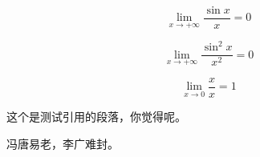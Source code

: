 \begin{example} 
    \[
        \lim_{x\to +\infty} \frac{\sin x}{x} = 0
    \]
\end{example}

\begin{corollary}
    \[
        \lim_{x\to +\infty} \frac{\sin^2 x}{x^2} = 0
    \]
\end{corollary}

\begin{remark}
    \[
        \lim_{x\to 0} \frac{x}{x} = 1
    \]
\end{remark}


这个是测试引用的段落\cite{Ibrahim2022}，你觉得呢\cite[定理 8]{SB2077}。

冯唐易老，李广难封\supercite{SB2077}。


